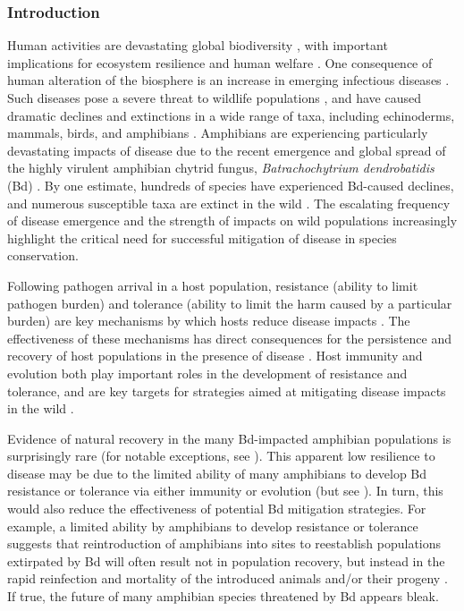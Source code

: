 \documentclass[
  letterpaper,
  DIV=11,
  numbers=noendperiod]{scrartcl}
\begin{document}
\subsubsection{Introduction}\label{introduction}

Human activities are devastating global biodiversity
\citep{ceballos2015}, with important implications for ecosystem
resilience and human welfare \citep{naeem2009}. One consequence of human
alteration of the biosphere is an increase in emerging infectious
diseases \citep{jones2008, fisher2012}. Such diseases pose a severe
threat to wildlife populations \citep{daszak2000}, and have caused
dramatic declines and extinctions in a wide range of taxa, including
echinoderms, mammals, birds, and amphibians
\citep{hewson2014, samuel2015, scheele2019, cunningham2021}. Amphibians
are experiencing particularly devastating impacts of disease due to the
recent emergence and global spread of the highly virulent amphibian
chytrid fungus, \emph{Batrachochytrium dendrobatidis} (Bd)
\citep{luedtke2023, scheele2019}. By one estimate, hundreds of species
have experienced Bd-caused declines, and numerous susceptible taxa are
extinct in the wild \citep{scheele2019}. The escalating frequency of
disease emergence and the strength of impacts on wild populations
increasingly highlight the critical need for successful mitigation of
disease in species conservation.

Following pathogen arrival in a host population, resistance (ability to
limit pathogen burden) and tolerance (ability to limit the harm caused
by a particular burden) are key mechanisms by which hosts reduce disease
impacts \citep{raberg2009}. The effectiveness of these mechanisms has
direct consequences for the persistence and recovery of host populations
in the presence of disease \citep{brannelly2021}. Host immunity and
evolution both play important roles in the development of resistance and
tolerance, and are key targets for strategies aimed at mitigating
disease impacts in the wild \citep{garner2016}.

Evidence of natural recovery in the many Bd-impacted amphibian
populations is surprisingly rare (for notable exceptions, see
\citep{scheele2017, voyles2018, knapp2016}). This apparent low
resilience to disease may be due to the limited ability of many
amphibians to develop Bd resistance or tolerance via either immunity
\citep{rosenblum2012, fites2013, grogan2018a} or evolution (but see
\citep{savage2016, grogan2018b}). In turn, this would also reduce the
effectiveness of potential Bd mitigation strategies. For example, a
limited ability by amphibians to develop resistance or tolerance
suggests that reintroduction of amphibians into sites to reestablish
populations extirpated by Bd will often result not in population
recovery, but instead in the rapid reinfection and mortality of the
introduced animals and/or their progeny
\citep{hammond2021, knapp2022, stockwell2008, scheele2021}. If true, the
future of many amphibian species threatened by Bd appears bleak.
\end{document}
